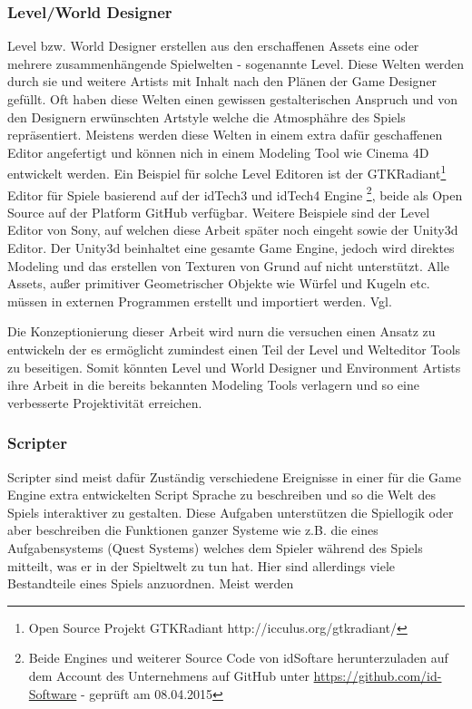 \documentclass[pagesize, paper=a4, fontsize=12pt, titlepage=true, headings=small, headnosepline, abstractoff, liststotoc, nochapterprefix, plainheadsepline, twoside]{scrreprt}
\begin{document}
\subsubsection{Level/World Designer}
Level bzw. World Designer erstellen aus den erschaffenen Assets eine oder mehrere zusammenhängende Spielwelten - sogenannte Level. Diese Welten werden durch sie und weitere Artists mit Inhalt nach den Plänen der Game Designer gefüllt. Oft haben diese Welten einen gewissen gestalterischen Anspruch und von den Designern erwünschten Artstyle welche die Atmosphähre des Spiels repräsentiert. Meistens werden diese Welten in einem extra dafür geschaffenen Editor angefertigt und können nich in einem Modeling Tool wie Cinema 4D entwickelt werden. Ein Beispiel für solche Level Editoren ist der GTKRadiant\footnote{Open Source Projekt GTKRadiant http://icculus.org/gtkradiant/} Editor für Spiele basierend auf der idTech3 und idTech4  Engine \footnote{Beide Engines und weiterer Source Code von idSoftare herunterzuladen auf dem Account des Unternehmens auf GitHub unter \url{https://github.com/id-Software} - geprüft am 08.04.2015}, beide als Open Source auf der Platform GitHub verfügbar. Weitere Beispiele sind der Level Editor von Sony, auf welchen diese Arbeit später noch eingeht sowie der Unity3d Editor. Der Unity3d beinhaltet eine gesamte Game Engine, jedoch wird direktes Modeling und das erstellen von Texturen von Grund auf nicht unterstützt. Alle Assets, außer primitiver Geometrischer Objekte wie Würfel und Kugeln etc. müssen in externen Programmen erstellt und importiert werden. Vgl. \autocite[S. 31 ]{Chandler2006}

Die Konzeptionierung dieser Arbeit wird nurn die versuchen einen Ansatz zu entwickeln der es ermöglicht zumindest einen Teil der Level und Welteditor Tools zu beseitigen. Somit könnten Level und World Designer und Environment Artists ihre Arbeit in die bereits bekannten Modeling Tools verlagern und so eine verbesserte Projektivität erreichen.

\subsubsection{Scripter}
Scripter sind meist dafür Zuständig verschiedene Ereignisse in einer für die Game Engine extra entwickelten Script Sprache zu beschreiben und so die Welt des Spiels interaktiver zu gestalten. Diese Aufgaben unterstützen die Spiellogik oder aber beschreiben die Funktionen ganzer Systeme wie z.B. die eines Aufgabensystems (Quest Systems) welches dem Spieler während des Spiels mitteilt, was er in der Spieltwelt zu tun hat. Hier sind allerdings viele Bestandteile eines Spiels anzuordnen. Meist werden 
\end{document}

